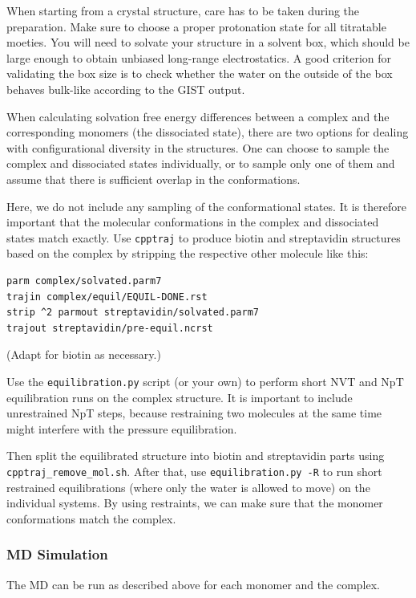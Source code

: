 \documentclass[9pt,tutorial]{livecoms}
\newcommand{\software}{\texttt}
\newcommand{\todo}{\textcolor{red}}
\begin{document}
When starting from a crystal structure, care has to be taken during the preparation.
Make sure to choose a proper protonation state for all titratable moeties.
You will need to solvate your structure in a solvent box, which should be large enough to obtain unbiased long-range electrostatics.
A good criterion for validating the box size is to check whether the water on the outside of the box behaves bulk-like according to the GIST output.

When calculating solvation free energy differences between a complex and the corresponding monomers (the dissociated state), there are two options for dealing with configurational diversity in the structures.
One can choose to sample the complex and dissociated states individually, or to sample only one of them and assume that there is sufficient overlap in the conformations.

Here, we do not include any sampling of the conformational states.
It is therefore important that the molecular conformations in the complex and dissociated states match exactly.
Use \software{cpptraj} to produce biotin and streptavidin structures based on the complex by stripping the respective other molecule like this:
\begin{lstlisting}[style=cpptraj]
parm complex/solvated.parm7
trajin complex/equil/EQUIL-DONE.rst
strip ^2 parmout streptavidin/solvated.parm7
trajout streptavidin/pre-equil.ncrst
\end{lstlisting}
(Adapt for biotin as necessary.)

Use the \software{equilibration.py} script (or your own) to perform short NVT and NpT equilibration runs on the complex structure.
It is important to include unrestrained NpT steps, because restraining two molecules at the same time might interfere with the pressure equilibration.

Then split the equilibrated structure into biotin and streptavidin parts using \software{cpptraj\_remove\_mol.sh}.
After that, use \software{equilibration.py -R} to run short restrained 
equilibrations (where only the water is allowed to move) on the individual 
systems.
By using restraints, we can make sure that the monomer conformations match the complex.

\subsubsection{MD Simulation}
The MD can be run as described above for each monomer and the complex.
\end{document}
